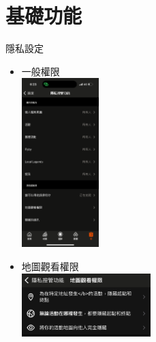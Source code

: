 \section{基礎功能}

\begin{frame}{隱私設定}
\begin{multicols}{2}
\begin{itemize}
\item 一般權限\\
\includegraphics[width=3cm]{privacy.png}
\item 地圖觀看權限\\
\includegraphics[width=5cm]{hideMap.png}
\end{itemize}
\end{multicols}
\end{frame}

